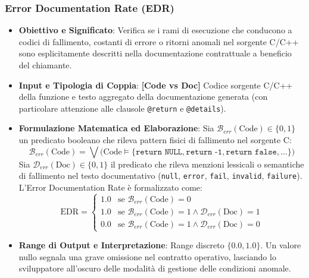 \subsubsection{Error Documentation Rate (EDR)}
\label{subsubsec:edr}
\begin{itemize}[leftmargin=*, label=\textbullet]
    \item \textbf{Obiettivo e Significato}: Verifica se i rami di esecuzione che conducono a codici di fallimento, costanti di errore o ritorni anomali nel sorgente C/C++ sono esplicitamente descritti nella documentazione contrattuale a beneficio del chiamante.
    \item \textbf{Input e Tipologia di Coppia}: \textbf{[Code vs Doc]} Codice sorgente C/C++ della funzione e testo aggregato della documentazione generata (con particolare attenzione alle clausole \texttt{@return} e \texttt{@details}).
    \item \textbf{Formulazione Matematica ed Elaborazione}: Sia $\mathcal{B}_{err}(\text{Code}) \in \{0, 1\}$ un predicato booleano che rileva pattern fisici di fallimento nel sorgente C:
    \begin{equation}
        \mathcal{B}_{err}(\text{Code}) = \bigvee \Big(\text{Code} \models \{\texttt{return NULL}, \texttt{return -1}, \texttt{return false}, \dots\}\Big)
    \end{equation}
    Sia $\mathcal{D}_{err}(\text{Doc}) \in \{0, 1\}$ il predicato che rileva menzioni lessicali o semantiche di fallimento nel testo documentativo (\texttt{null}, \texttt{error}, \texttt{fail}, \texttt{invalid}, \texttt{failure}). L'Error Documentation Rate è formalizzato come:
    \begin{equation}
        \text{EDR} = \begin{cases}
            1.0 & \text{se } \mathcal{B}_{err}(\text{Code}) = 0 \\
            1.0 & \text{se } \mathcal{B}_{err}(\text{Code}) = 1 \land \mathcal{D}_{err}(\text{Doc}) = 1 \\
            0.0 & \text{se } \mathcal{B}_{err}(\text{Code}) = 1 \land \mathcal{D}_{err}(\text{Doc}) = 0
        \end{cases}
        \label{eq:edr_formula}
    \end{equation}
    \item \textbf{Range di Output e Interpretazione}: Range discreto $\{0.0, 1.0\}$. Un valore nullo segnala una grave omissione nel contratto operativo, lasciando lo sviluppatore all'oscuro delle modalità di gestione delle condizioni anomale.
\end{itemize}

